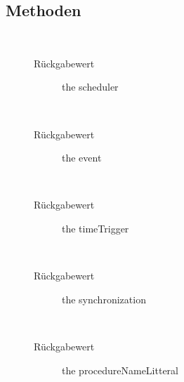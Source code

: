 \subsection{Methoden}
\begin{description}
\item[{\label{ontologyFramework.OFDataMapping.ReservatedDataType.Procedure.getScheduler()}}]
~ 
\begin{description}
\item[Rückgabewert] 
the scheduler
\end{description}
\item[{\label{ontologyFramework.OFDataMapping.ReservatedDataType.Procedure.getEvent()}}]
~ 
\begin{description}
\item[Rückgabewert] 
the event
\end{description}
\item[{\label{ontologyFramework.OFDataMapping.ReservatedDataType.Procedure.getTimeTrigger()}}]
~ 
\begin{description}
\item[Rückgabewert] 
the timeTrigger
\end{description}
\item[{\label{ontologyFramework.OFDataMapping.ReservatedDataType.Procedure.getSynchronization()}}]
~ 
\begin{description}
\item[Rückgabewert] 
the synchronization
\end{description}
\item[{\label{ontologyFramework.OFDataMapping.ReservatedDataType.Procedure.getProcedureNameLitteral()}}]
~ 
\begin{description}
\item[Rückgabewert] 
the procedureNameLitteral
\end{description}
\item[{\label{ontologyFramework.OFDataMapping.ReservatedDataType.Procedure.getProcedureName()}}]

\end{description}
